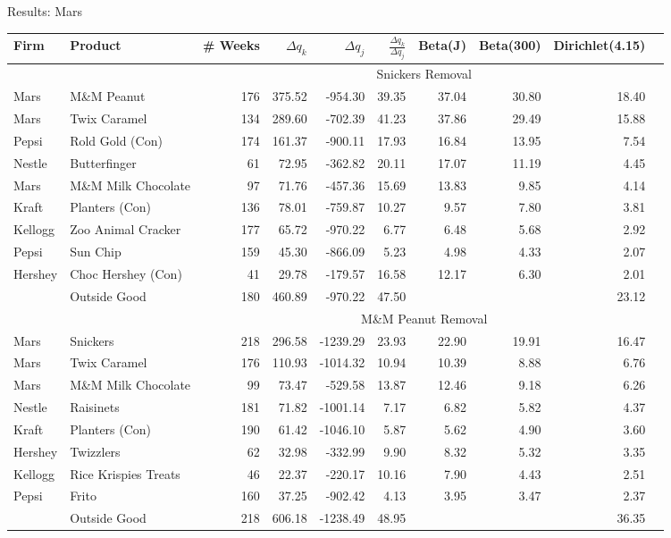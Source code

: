 \documentclass[aspectratio=169]{beamer}
\begin{document}
\begin{frame}{Results: Mars }
\tiny
\begin{tabular}{ll |   r r r r  r r r  r}
Firm & Product & \# Weeks & $\Delta q_k$ & $\Delta q_j$ & $\frac{\Delta q_k}{\Delta q_j}$ & Beta(J) & Beta(300) & Dirichlet(4.15)\\ 
\hline  &&\multicolumn{7}{c}{Snickers Removal}\\ \hline
Mars & M\&M Peanut & 176 & 375.52 & -954.30 & 39.35 & 37.04 & 30.80 & 18.40 \\
Mars & Twix Caramel & 134 & 289.60 & -702.39 & 41.23 & 37.86 & 29.49 & 15.88 \\
Pepsi & Rold Gold (Con) & 174 & 161.37 & -900.11 & 17.93 & 16.84 & 13.95 & 7.54 \\
Nestle & Butterfinger & 61 & 72.95 & -362.82 & 20.11 & 17.07 & 11.19 & 4.45 \\
Mars & M\&M Milk Chocolate & 97 & 71.76 & -457.36 & 15.69 & 13.83 & 9.85 & 4.14 \\
Kraft & Planters (Con) & 136 & 78.01 & -759.87 & 10.27 & 9.57 & 7.80 & 3.81 \\
Kellogg & Zoo Animal Cracker & 177 & 65.72 & -970.22 & 6.77 & 6.48 & 5.68 & 2.92 \\
Pepsi & Sun Chip & 159 & 45.30 & -866.09 & 5.23 & 4.98 & 4.33 & 2.07 \\
Hershey & Choc Hershey (Con) & 41 & 29.78 & -179.57 & 16.58 & 12.17 & 6.30 & 2.01 \\
& Outside Good & 180 & 460.89 & -970.22 & 47.50 &  &  & 23.12 \\

\hline  &&\multicolumn{7}{c}{M\&M Peanut Removal}\\ \hline
Mars & Snickers & 218 & 296.58 & -1239.29 & 23.93 & 22.90 & 19.91 & 16.47 \\
Mars & Twix Caramel & 176 & 110.93 & -1014.32 & 10.94 & 10.39 & 8.88 & 6.76 \\
Mars & M\&M Milk Chocolate & 99 & 73.47 & -529.58 & 13.87 & 12.46 & 9.18 & 6.26 \\
Nestle & Raisinets & 181 & 71.82 & -1001.14 & 7.17 & 6.82 & 5.82 & 4.37 \\
Kraft & Planters (Con) & 190 & 61.42 & -1046.10 & 5.87 & 5.62 & 4.90 & 3.60 \\
Hershey & Twizzlers & 62 & 32.98 & -332.99 & 9.90 & 8.32 & 5.32 & 3.35 \\
Kellogg & Rice Krispies Treats & 46 & 22.37 & -220.17 & 10.16 & 7.90 & 4.43 & 2.51 \\
Pepsi & Frito  & 160 & 37.25 & -902.42 & 4.13 & 3.95 & 3.47 & 2.37 \\
& Outside Good& 218 & 606.18 & -1238.49 & 48.95 &  &  & 36.35 \\
\end{tabular}
\end{frame}
\end{document}
